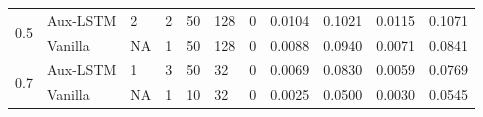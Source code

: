 \begin{table}
{\begin{tabular}{|lllllllllll|}
\multirow{2}{*}{0.5} & Aux-LSTM      & 2                                                               & 2                                                               & 50             & 128                                                            & 0                & 0.0104                                                                    & 0.1021                                                                                        & 0.0115                                                               & 0.1071                                                              \\
                     & Vanilla       & NA                                                              & 1                                                               & 50             & 128                                                            & 0                & 0.0088                                                                    & 0.0940                                                                                        & 0.0071                                                               & 0.0841                                                              \\ \hline
\multirow{2}{*}{0.7} & Aux-LSTM      & 1                                                               & 3                                                               & 50             & 32                                                             & 0                & 0.0069                                                                    & 0.0830                                                                                        & 0.0059                                                               & 0.0769                                                              \\
                     & Vanilla       & NA                                                              & 1                                                               & 10             & 32                                                             & 0                & 0.0025                                                                    & 0.0500                                                                                        & 0.0030                                                               & 0.0545                                                              \\ \hline
\end{tabular}}
\end{table}

